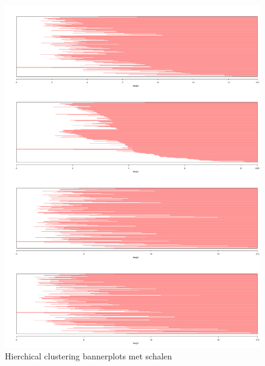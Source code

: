 \documentclass[a4paper,kulak]{kulakarticle}
\begin{document}
\begin{figure}[H]
	\centering
	\includegraphics[height=\textheight]{figures/hierachicalClusteringScaledBanner.jpg}
	\caption{Hierchical clustering bannerplots met schalen}
	\label{fig:hcb}
\end{figure}
\end{document}
